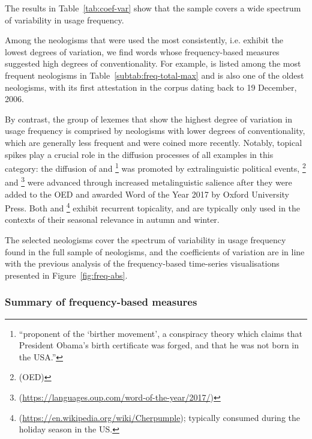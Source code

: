 \documentclass[
  a4paper,
  abstract=on,
  captions=tableabove
  ]{scrartcl}
\begin{document}
      The results in Table~\ref{tab:coef-var} show that the sample covers a wide spectrum of variability in usage frequency.

      Among the neologisms that were used the most consistently, i.e. exhibit the lowest degrees of variation, we find words whose frequency-based measures suggested high degrees of conventionality. For example,  is listed among the most frequent neologisms in Table~\ref{subtab:freq-total-max} and is also one of the oldest neologisms, with its first attestation in the corpus dating back to 19 December, 2006.

      By contrast, the group of lexemes that show the highest degree of variation in usage frequency is comprised by neologisms with lower degrees of conventionality, which are generally less frequent and were coined more recently. Notably, topical spikes play a crucial role in the diffusion processes of all examples in this category: the diffusion of  and \footnote{\enquote{proponent of the \enquote{birther movement}, a conspiracy theory which claims that President Obama's birth certificate was forged, and that he was not born in the USA.}} was promoted by extralinguistic political events, \footnote{ (OED)} and \footnote{ (\url{https://languages.oup.com/word-of-the-year/2017/})} were advanced through increased metalinguistic salience after they were added to the OED and awarded Word of the Year 2017 by Oxford University Press. Both  and \footnote{ (\url{https://en.wikipedia.org/wiki/Cherpumple}); typically consumed during the holiday season in the US.} exhibit recurrent topicality, and are typically only used in the contexts of their seasonal relevance in autumn and winter.

      The selected neologisms cover the spectrum of variability in usage frequency found in the full sample of neologisms, and the coefficients of variation are in line with the previous analysis of the frequency-based time-series visualisations presented in Figure~\ref{fig:freq-abs}.


      \subsubsection{Summary of frequency-based measures}
\end{document}
